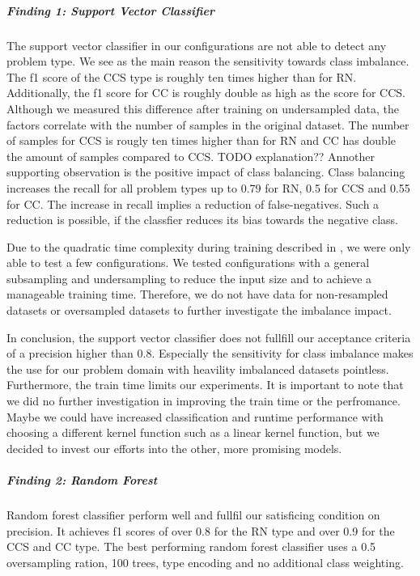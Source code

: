 \subparagraph{Finding 1: Support Vector Classifier}
The support vector classifier in our configurations are not able to detect any problem type. We see as the main reason the sensitivity towards class imbalance. The  f1 score of the CCS type is roughly ten times higher than for RN. Additionally, the f1 score for CC is roughly double as high as the score for CCS. Although we measured this difference after training on undersampled data, the factors correlate with the number of samples in the original dataset. The number of samples for CCS is rougly ten times higher than for RN and CC has double the amount of samples compared to CCS. TODO explanation??
Annother supporting observation is the positive impact of class balancing. Class balancing increases the recall for all problem types up to 0.79 for RN, 0.5 for CCS and 0.55 for CC. The increase in recall implies a reduction of false-negatives. Such a reduction is possible, if the classfier reduces its bias towards the negative class. 

Due to the quadratic time complexity during training described in , we were only able to test a few configurations. We tested configurations with a general subsampling and undersampling to reduce the input size and to achieve a manageable training time. Therefore, we do not have data for non-resampled datasets or oversampled datasets to further investigate the imbalance impact.

In conclusion, the support vector classifier does not fullfill our acceptance criteria of a precision higher than 0.8. Especially the sensitivity for class imbalance makes the use for our problem domain with heavility imbalanced datasets pointless.  
Furthermore, the train time limits our experiments. It is important to note that we did no further investigation in improving the train time or the perfromance. Maybe we could have increased classification and runtime performance with choosing a different kernel function such as a linear kernel function, but we decided to invest our efforts into the other, more promising models. 

\subparagraph{Finding 2: Random Forest}
Random forest classifier perform well and fullfil our satisficing condition on precision. It achieves f1 scores of over 0.8 for the RN type and over 0.9 for the CCS and CC type.
The best performing random forest classifier uses a 0.5 oversampling ration, 100 trees, type encoding and no additional class weighting.



